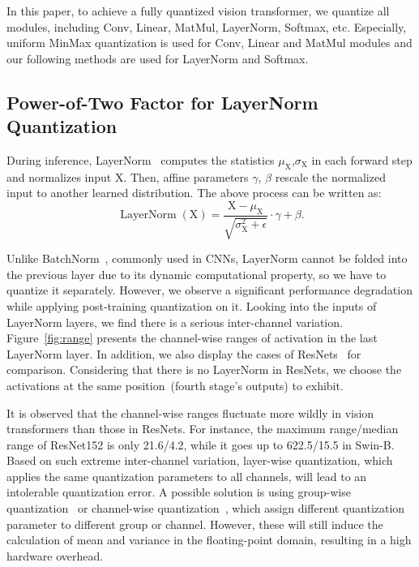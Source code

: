 \documentclass{article}
\begin{document}
In this paper, to achieve a fully quantized vision transformer, we quantize all modules, including Conv, Linear, MatMul, LayerNorm, Softmax, etc.
Especially, uniform MinMax quantization is used for Conv, Linear and MatMul modules and our following methods are used for LayerNorm and Softmax.

\subsection{Power-of-Two Factor for LayerNorm Quantization}
\label{sec:ptf}

During inference, LayerNorm~\cite{ba2016layer} computes the statistics $\mu_\textrm{X}$,$\sigma_\textrm{X}$ in each forward step and normalizes input $\textrm{X}$. Then, affine parameters $\gamma$, $\beta$ rescale the normalized input to another learned distribution. The above process can be written as:
\begin{equation}
    \operatorname{LayerNorm}(\textrm{X}) = \frac{\textrm{X}-\mu_\textrm{X}}{\sqrt{\sigma_\textrm{X}^2+\epsilon}}\cdot\gamma + \beta.
\end{equation}


Unlike BatchNorm~\cite{ioffe2015batch}, commonly used in CNNs, LayerNorm cannot be folded into the previous layer due to its dynamic computational property, so we have to quantize it separately. However, we observe a significant performance degradation while applying post-training quantization on it.
Looking into the inputs of LayerNorm layers, we find there is a serious inter-channel variation.
Figure~\ref{fig:range} presents the channel-wise ranges of activation in the last LayerNorm layer. In addition, we also display the cases of ResNets~\cite{he2016deep} for comparison. Considering that there is no LayerNorm in ResNets, we choose the activations at the same position~(fourth stage's outputs) to exhibit.

It is observed that the channel-wise ranges fluctuate more wildly in vision transformers than those in ResNets. For instance, the maximum range/median range of ResNet152 is only 21.6/4.2, while it goes up to 622.5/15.5 in Swin-B.
Based on such extreme inter-channel variation, layer-wise quantization, which applies the same quantization parameters to all channels, will lead to an intolerable quantization error. A possible solution is using group-wise quantization~\cite{shen2020q} or channel-wise quantization~\cite{li2019fully}, which assign different quantization parameter to different group or channel. However, these will still induce the calculation of mean and variance in the floating-point domain, resulting in a high hardware overhead.
\end{document}
